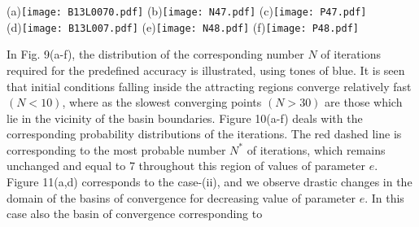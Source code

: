 \documentclass[preprint,fleqn,5p,numbers,sort&compress]{elsarticle}
\begin{document}
\begin{figure*}\label{Fig:12}
\begin{center}
(a)\texttt{[image: B13L0070.pdf]}%
(b)\texttt{[image: N47.pdf]}
(c)\texttt{[image: P47.pdf]}\\
(d)\texttt{[image: B13L007.pdf]}%
(e)\texttt{[image: N48.pdf]}
(f)\texttt{[image: P48.pdf]}
\caption{The Newton-Raphson basins of attraction on the $xy$-plane for the case when thirteen libration points exist for:  (a) $e=-0.457853$; (d) $e=-0.466$. The color code denoting the attractors is as follows:$L_1$ (\emph{yellow}); $L_2$ (\emph{Darker blue}); $L_3$ (\emph{gray}); $L_4$ (\emph{green}); $L_5$ (\emph{red}); $L_6$ (\emph{blue}); $L_7$ (\emph{cyan}); $L_8$ (\emph{purple}); $L_9$ (\emph{crimson}); $L_{10}$ (\emph{teal}); $L_{11}$ (\emph{magenta}); $L_{12}$ (\emph{orange}); $L_{13}$ (\emph{light green}) and non-converging points (\emph{white}). (b, e: the middle panels)
  The corresponding
  distribution of the number $N$ of required iterations for obtaining the attracting
  regions, (c, f: the right panels) the corresponding probability distributions of required number of iterations
  for obtaining the Newton-Raphson basins of convergence, shown in panels (a, d) respectively. The vertical, dashed, red line indicates, in each case,
the most probable number $N^*$ of iterations. The black dots show the position of the libration points. (colour figure online).}
\end{center}
\end{figure*}
In Fig. \textcolor[rgb]{1.00,0.00,0.50}{9}(a-f), the distribution of the corresponding number $N $
of iterations required for the predefined accuracy is illustrated,
using tones of blue. It is
seen that initial conditions falling inside the attracting regions
converge relatively fast $(N < 10)$, where as the slowest converging
points $(N > 30)$ are those which lie in the vicinity of the basin
boundaries. Figure \textcolor[rgb]{1.00,0.00,0.50}{10}(a-f)
deals with the corresponding probability distributions of the iterations.
The red dashed line is corresponding to the most probable number $N^*$
of iterations, which remains unchanged and equal to 7 throughout
this region of values of parameter $e$.\\
Figure \textcolor[rgb]{1.00,0.00,0.50}{11}(a,d) corresponds to
the case-(ii), and we observe drastic changes in the domain of
the basins of convergence for decreasing value of parameter $e$.
In this case also the basin of convergence corresponding to
\end{document}
